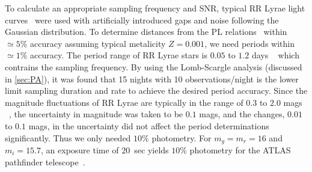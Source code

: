 \documentclass[aps,prb,twocolumn,superscriptaddress]{revtex4-1}
\begin{document}
To calculate an appropriate sampling frequency and SNR, typical RR Lyrae light curves~\cite{RRLyrae} were used with artificially introduced gaps and noise following the Gaussian distribution. To determine distances from the PL relations~\citep{PL} within $\simeq5\%$ accuracy assuming typical metalicity $Z=0.001$, we need periods within $\simeq1\%$ accuracy. The period range of RR Lyrae stars is $0.05$ to $1.2$ days ~\cite{Astro} which contrains the sampling frequency. By using the Lomb-Scargle analysis (discussed in \cref{sec:PA}), it was found that 15 nights with 10 observations/night is the lower limit sampling duration and rate to achieve the desired period accuracy. Since the magnitude fluctuations of RR Lyrae are typically in the range of $0.3$ to $2.0$ mags ~\cite{AAVSO}, the uncertainty in magnitude was taken to be $0.1$ mags, and the changes, $0.01$ to $0.1$ mags, in the uncertainty did not affect the period determinations significantly. Thus we only needed $10\%$ photometry. For $m_g = m_r = 16$ and $m_i = 15.7$, an exposure time of $20$~sec yields $10\%$ photometry for the ATLAS pathfinder telescope~\citep{fallingstar}.

\end{document}
